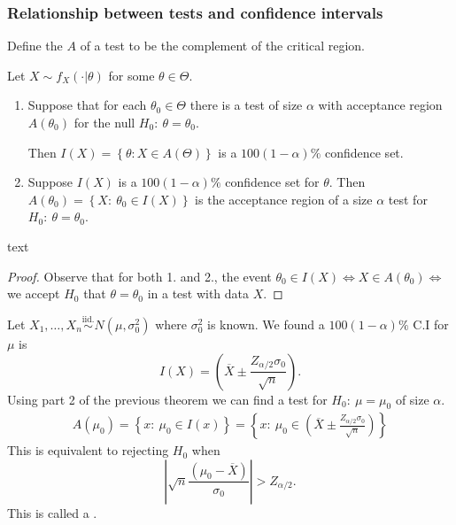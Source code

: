 \documentclass[egregdoesnotlikesansseriftitles,a4paper]{scrartcl}
\begin{document}
\subsubsection*{Relationship between tests and confidence intervals}
\begin{definition*}
      Define the  $A$ of a test to be the complement of the critical region.
\end{definition*}
Let $X \sim f_{X}(\cdot | \theta)$ for some $\theta \in \Theta$.
\begin{theorem}
      \begin{enumerate}
           \item Suppose that for each $\theta_0 \in \Theta$ there is a test of size $\alpha$ with acceptance region $A (\theta_0 )$ for the null $H_0 : \ \theta =\theta_0 $. 
           
           Then $I (X)=\left\{\theta: X \in A (\Theta)\right\}$ is a $100 (1-\alpha)\%$ confidence set.
           \item Suppose $I (X)$ is a $100 (1-\alpha)\%$ confidence set for $\theta$. Then $A (\theta_0 )=\left\{X: \ \theta_0 \in I (X)\right\}$ is the acceptance region of a size $\alpha$ test for $H_0 : \ \theta =\theta_0 $.
      \end{enumerate}
      text
      \begin{proof}
            Observe that for both 1. and 2., the event $\theta_0 \in I (X) \iff X \in A (\theta_0 ) \iff $ we accept $H_0 $ that $\theta=\theta_0 $ in a test with data $X$.
      \end{proof}
\end{theorem}
\begin{example*}
      Let $X_1 , \ldots, X_{n} \overset{\operatorname{iid.}}{\sim} N (\mu, \sigma_0^2)$ where $\sigma_0 ^2$ is known. We found a $100 (1-\alpha)\%$ C.I  for $\mu$ is \[
      I (X)=\left(\overline{X} \pm \frac{Z_{\alpha/2}\sigma_0 }{\sqrt{n}}\right)
      .\] Using part 2 of the previous theorem we can find a test for $H_0: \ \mu=\mu_0 $ of size $\alpha$. 
      \begin{align*}
           A (\mu_0 )= \left\{x: \ \mu_0 \in I (x)\right\}=\left\{x: \ \mu_0 \in \left(\overline{X} \pm \frac{Z_{\alpha/2}\sigma_0 }{\sqrt{n}}\right)\right\}
      \end{align*}
      This is equivalent to rejecting $H_0 $ when \[
      \left|\sqrt{n} \frac{(\mu_0 -\overline{X})}{\sigma_0 }\right|> Z_{\alpha/2}
      .\] This is called a .
\end{example*}
\end{document}
